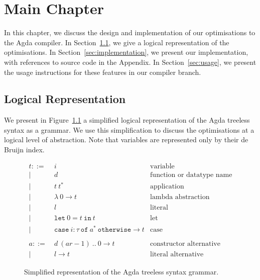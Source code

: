 \chapter{Main Chapter}
\label{cha:main_chapter}

In this chapter, we discuss the design and implementation of our optimisations to the Agda compiler. In Section~\ref{sec:logical_representation}, we give a logical representation of the optimisations. In Section~\ref{sec:implementation}, we present our implementation, with references to source code in the Appendix. In Section~\ref{sec:usage}, we present the usage instructions for these features in our compiler branch.


\section{Logical Representation}
\label{sec:logical_representation}

We present in Figure~\ref{fig:treeless_grammar} a simplified logical representation of the Agda treeless syntax as a grammar. We use this simplification to discuss the optimisations at a logical level of abstraction. Note that variables are represented only by their de Bruijn index.

\begin{figure}[h!]
\begin{align*}
t ::=~& i & \text{variable}\\
|~& d & \text{function or datatype name}\\
|~& t~t^* & \text{application}\\
|~& \lambda~0 \to t & \text{lambda abstraction}\\
|~& l & \text{literal}\\
|~& \mathtt{let}~0 = t~\mathtt{in}~t & \text{let}\\
|~& \mathtt{case}~i : \tau~\mathtt{of}~a^*~\mathtt{otherwise} \to t& \text{case}\\
\\
a ::=~& d~(ar-1)~..~0 \to t & \text{constructor alternative}\\
|~& l \to t & \text{literal alternative}
\end{align*}
\caption{Simplified representation of the Agda treeless syntax grammar.}
\label{fig:treeless_grammar}
\end{figure}

